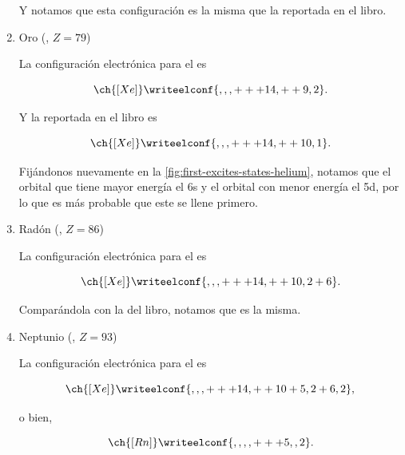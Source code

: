 \documentclass[./../main.tex]{subfiles}
\begin{document}
\begin{exercise}
\begin{solution}
\begin{enumerate}
                Y notamos que esta configuración es la misma que la reportada en el libro.

                \item Oro (, \(Z = 79\))
                
                La configuración electrónica para el  es

                \begin{equation*}
                    \ch{[Xe]}\writeelconf{,,,+++14,++9,2}.
                \end{equation*}

                Y la reportada en el libro es

                \begin{equation*}
                    \ch{[Xe]}\writeelconf{,,,+++14,++10,1}.
                \end{equation*}

                Fijándonos nuevamente en la \cref{fig:first-excites-states-helium}, notamos que el orbital que tiene mayor energía el 6s y el orbital con menor energía el 5d, por lo que es más probable que este se llene primero.
                
                \item Radón (, \(Z = 86\))
                
                La configuración electrónica para el  es

                \begin{equation*}
                    \ch{[Xe]}\writeelconf{,,,+++14,++10,2+6}.
                \end{equation*}

                Comparándola con la del libro, notamos que es la misma.
                
                \item Neptunio (, \(Z = 93\))
                
                La configuración electrónica para el  es

                \begin{equation*}
                    \ch{[Xe]}\writeelconf{,,,+++14,++10+5,2+6,2},
                \end{equation*}

                o bien,

                \begin{equation*}
                    \ch{[Rn]}\writeelconf{,,,,+++5,,2}.
                \end{equation*}


\end{enumerate}
\end{solution}
\end{exercise}
\end{document}
